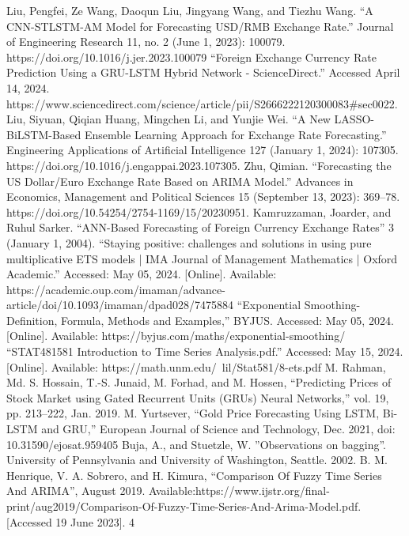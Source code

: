 \documentclass{ieeeojies}
\begin{document}
\begin{thebibliography}{00}
 Liu, Pengfei, Ze Wang, Daoqun Liu, Jingyang Wang, and Tiezhu Wang. “A CNN-STLSTM-AM Model for Forecasting USD/RMB Exchange Rate.” Journal of Engineering Research 11, no. 2 (June 1, 2023): 100079. https://doi.org/10.1016/j.jer.2023.100079
 “Foreign Exchange Currency Rate Prediction Using a GRU-LSTM Hybrid Network - ScienceDirect.” Accessed April 14, 2024. https://www.sciencedirect.com/science/article/pii/S2666222120300083#sec0022.
 Liu, Siyuan, Qiqian Huang, Mingchen Li, and Yunjie Wei. “A New LASSO-BiLSTM-Based Ensemble Learning Approach for Exchange Rate Forecasting.” Engineering Applications of Artificial Intelligence 127 (January 1, 2024): 107305. https://doi.org/10.1016/j.engappai.2023.107305.
 Zhu, Qimian. “Forecasting the US Dollar/Euro Exchange Rate Based on ARIMA Model.” Advances in Economics, Management and Political Sciences 15 (September 13, 2023): 369–78. https://doi.org/10.54254/2754-1169/15/20230951.
 Kamruzzaman, Joarder, and Ruhul Sarker. “ANN-Based Forecasting of Foreign Currency Exchange Rates” 3 (January 1, 2004).
 “Staying positive: challenges and solutions in using pure multiplicative ETS models | IMA Journal of Management Mathematics | Oxford Academic.” Accessed: May 05, 2024. [Online]. Available: https://academic.oup.com/imaman/advance-article/doi/10.1093/imaman/dpad028/7475884
 “Exponential Smoothing- Definition, Formula, Methods and Examples,” BYJUS. Accessed: May 05, 2024. [Online]. Available: https://byjus.com/maths/exponential-smoothing/
“STAT481581 Introduction to Time Series Analysis.pdf.” Accessed: May 15, 2024. [Online]. Available: https://math.unm.edu/~lil/Stat581/8-ets.pdf
  M. Rahman, Md. S. Hossain, T.-S. Junaid, M. Forhad, and M. Hossen, “Predicting Prices of Stock Market using Gated Recurrent Units (GRUs) Neural Networks,” vol. 19, pp. 213–222, Jan. 2019.
 M. Yurtsever, “Gold Price Forecasting Using LSTM, Bi-LSTM and GRU,” European Journal of Science and Technology, Dec. 2021, doi: 10.31590/ejosat.959405
 Buja, A., and Stuetzle, W. ''Observations on bagging''. University of Pennsylvania and University of Washington, Seattle. 2002.
 B. M. Henrique, V. A. Sobrero, and H. Kimura, ``Comparison Of Fuzzy Time Series And ARIMA'', August 2019. Available:https://www.ijstr.org/final-print/aug2019/Comparison-Of-Fuzzy-Time-Series-And-Arima-Model.pdf. [Accessed 19 June 2023]. 4

\end{thebibliography}
\end{document}
